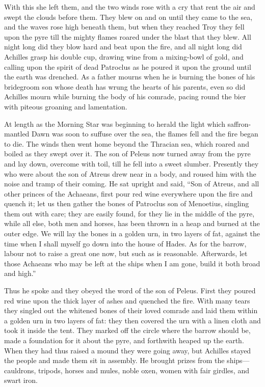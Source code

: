 With this she left them, and the two winds rose with a cry that rent the
air and swept the clouds before them. They blew on and on until they came
to the sea, and the waves rose high beneath them, but when they reached
Troy they fell upon the pyre till the mighty flames roared under the blast
that they blew. All night long did they blow hard and beat upon the fire,
and all night long did Achilles grasp his double cup, drawing wine from a
mixing-bowl of gold, and calling upon the spirit of dead Patroclus as he
poured it upon the ground until the earth was drenched. As a father mourns
when he is burning the bones of his bridegroom son whose death has wrung
the hearts of his parents, even so did Achilles mourn while burning the
body of his comrade, pacing round the bier with piteous groaning and
lamentation.

At length as the Morning Star was beginning to herald the light which
saffron-mantled Dawn was soon to suffuse over the sea, the flames fell and
the fire began to die. The winds then went home beyond the Thracian sea,
which roared and boiled as they swept over it. The son of Peleus now
turned away from the pyre and lay down, overcome with toil, till he fell
into a sweet slumber. Presently they who were about the son of Atreus drew
near in a body, and roused him with the noise and tramp of their coming.
He sat upright and said, “Son of Atreus, and all other princes of the
Achaeans, first pour red wine everywhere upon the fire and quench it; let
us then gather the bones of Patroclus son of Menoetius, singling them out
with care; they are easily found, for they lie in the middle of the pyre,
while all else, both men and horses, has been thrown in a heap and burned
at the outer edge. We will lay the bones in a golden urn, in two layers of
fat, against the time when I shall myself go down into the house of Hades.
As for the barrow, labour not to raise a great one now, but such as is
reasonable. Afterwards, let those Achaeans who may be left at the ships
when I am gone, build it both broad and high.”

Thus he spoke and they obeyed the word of the son of Peleus. First they
poured red wine upon the thick layer of ashes and quenched the fire. With
many tears they singled out the whitened bones of their loved comrade and
laid them within a golden urn in two layers of fat: they then covered the
urn with a linen cloth and took it inside the tent. They marked off the
circle where the barrow should be, made a foundation for it about the
pyre, and forthwith heaped up the earth. When they had thus raised a mound
they were going away, but Achilles stayed the people and made them sit in
assembly. He brought prizes from the ships—cauldrons, tripods,
horses and mules, noble oxen, women with fair girdles, and swart iron.

